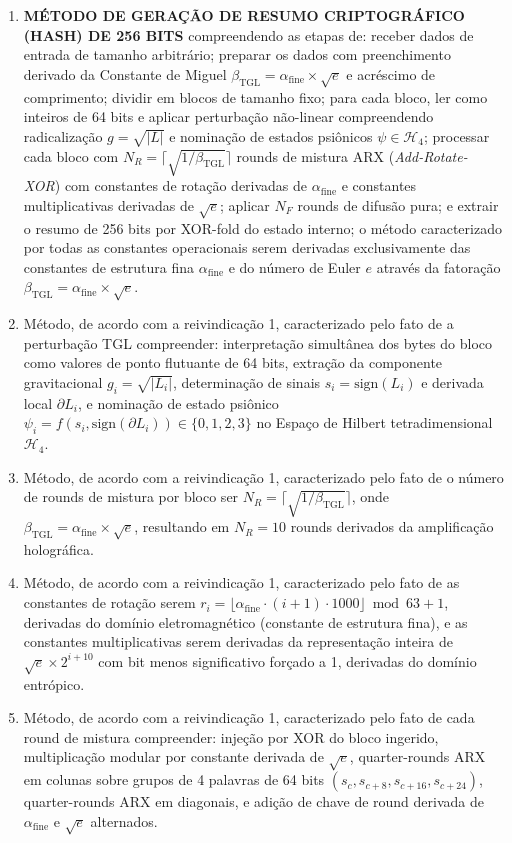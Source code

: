 \documentclass[12pt,a4paper]{article}
\newcommand{\betatgl}{\beta_{\!\scriptscriptstyle\mathrm{TGL}}}
\newcommand{\afine}{\alpha_{\mathrm{fine}}}
\begin{document}
\begin{enumerate}
\item \textbf{MÉTODO DE GERAÇÃO DE RESUMO CRIPTOGRÁFICO (HASH) DE 256 BITS} compreendendo as etapas de: receber dados de entrada de tamanho arbitrário; preparar os dados com preenchimento derivado da Constante de Miguel $\betatgl = \afine \times \sqrt{e}$ e acréscimo de comprimento; dividir em blocos de tamanho fixo; para cada bloco, ler como inteiros de 64 bits e aplicar perturbação não-linear compreendendo radicalização $g = \sqrt{|L|}$ e nominação de estados psiônicos $\psi \in \mathcal{H}_4$; processar cada bloco com $N_R = \lceil\sqrt{1/\betatgl}\rceil$ rounds de mistura ARX (\textit{Add-Rotate-XOR}) com constantes de rotação derivadas de $\afine$ e constantes multiplicativas derivadas de $\sqrt{e}$; aplicar $N_F$ rounds de difusão pura; e extrair o resumo de 256 bits por XOR-fold do estado interno; o método caracterizado por todas as constantes operacionais serem derivadas exclusivamente das constantes de estrutura fina $\afine$ e do número de Euler $e$ através da fatoração $\betatgl = \afine \times \sqrt{e}$.

\item Método, de acordo com a reivindicação 1, caracterizado pelo fato de a perturbação TGL compreender: interpretação simultânea dos bytes do bloco como valores de ponto flutuante de 64 bits, extração da componente gravitacional $g_i = \sqrt{|L_i|}$, determinação de sinais $s_i = \mathrm{sign}(L_i)$ e derivada local $\partial L_i$, e nominação de estado psiônico $\psi_i = f(s_i, \mathrm{sign}(\partial L_i)) \in \{0,1,2,3\}$ no Espaço de Hilbert tetradimensional $\mathcal{H}_4$.

\item Método, de acordo com a reivindicação 1, caracterizado pelo fato de o número de rounds de mistura por bloco ser $N_R = \lceil\sqrt{1/\betatgl}\rceil$, onde $\betatgl = \afine \times \sqrt{e}$, resultando em $N_R = 10$ rounds derivados da amplificação holográfica.

\item Método, de acordo com a reivindicação 1, caracterizado pelo fato de as constantes de rotação serem $r_i = \lfloor \afine \cdot (i+1) \cdot 1000 \rfloor \bmod 63 + 1$, derivadas do domínio eletromagnético (constante de estrutura fina), e as constantes multiplicativas serem derivadas da representação inteira de $\sqrt{e} \times 2^{i+10}$ com bit menos significativo forçado a 1, derivadas do domínio entrópico.

\item Método, de acordo com a reivindicação 1, caracterizado pelo fato de cada round de mistura compreender: injeção por XOR do bloco ingerido, multiplicação modular por constante derivada de $\sqrt{e}$, quarter-rounds ARX em colunas sobre grupos de 4 palavras de 64 bits $(s_c, s_{c+8}, s_{c+16}, s_{c+24})$, quarter-rounds ARX em diagonais, e adição de chave de round derivada de $\afine$ e $\sqrt{e}$ alternados.


\end{enumerate}
\end{document}
